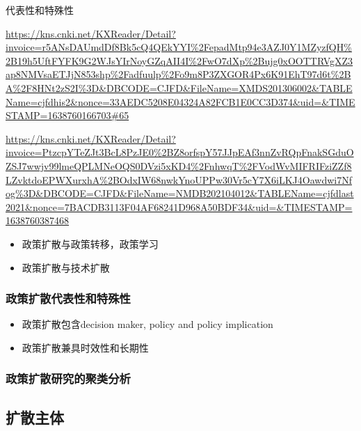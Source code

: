 \documentclass[
  12pt,
]{ctexart}
\providecommand{\tightlist}{%
  \setlength{\itemsep}{0pt}\setlength{\parskip}{0pt}}
\begin{document}
代表性和特殊性

\url{https://kns.cnki.net/KXReader/Detail?invoice=r5ANsDAUmdDf8Bk5cQ4QEkYYI\%2FepadMtp94e3AZJ0Y1MZyzfQH\%2B19h5UftFYFK9G2WJsYIrNoyGZqAII4I\%2FwO7dXp\%2Bujg0xOOTTRVgXZ3ap8NMVsaETJjN853shp\%2Fadfuulp\%2Fo9m8P3ZXGOR4Px6K91EhT97d6t\%2BA\%2F8HNt2zS2I\%3D\&DBCODE=CJFD\&FileName=XMDS201306002\&TABLEName=cjfdhis2\&nonce=33AEDC5208E04324A82FCB1E0CC3D374\&uid=\&TIMESTAMP=1638760166703\#65}

\url{https://kns.cnki.net/KXReader/Detail?invoice=PtzcpYTeZJt3BcL8PzJE0\%2BZ8orfspY57JJpEAf3nnZvRQpFnakSGduOZSJ7wwjv99lmeQPLMNeOQS0DVzi5xKD4\%2FnhwqT\%2FVodWvMIFRIFziZZf8LZvktdoEPWXurxhA\%2BOdxIW68nwkYnoUPPw30Vr5cY7X6iLKJ4Oawdwi7Nfog\%3D\&DBCODE=CJFD\&FileName=NMDB202104012\&TABLEName=cjfdlast2021\&nonce=7BACDB3113F04AF68241D968A50BDF34\&uid=\&TIMESTAMP=1638760387468}

\begin{itemize}
\item
  政策扩散与政策转移，政策学习
\item
  政策扩散与技术扩散
\end{itemize}

\hypertarget{ux653fux7b56ux6269ux6563ux4ee3ux8868ux6027ux548cux7279ux6b8aux6027}{%
\subsubsection{政策扩散代表性和特殊性}\label{ux653fux7b56ux6269ux6563ux4ee3ux8868ux6027ux548cux7279ux6b8aux6027}}

\begin{itemize}
\tightlist
\item
  政策扩散包含decision maker, policy and policy implication
\item
  政策扩散兼具时效性和长期性
\end{itemize}

\hypertarget{ux653fux7b56ux6269ux6563ux7814ux7a76ux7684ux805aux7c7bux5206ux6790}{%
\subsubsection{政策扩散研究的聚类分析}\label{ux653fux7b56ux6269ux6563ux7814ux7a76ux7684ux805aux7c7bux5206ux6790}}

\hypertarget{ux6269ux6563ux4e3bux4f53}{%
\subsection{扩散主体}\label{ux6269ux6563ux4e3bux4f53}}
\end{document}

